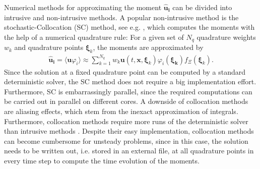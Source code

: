 Numerical methods for approximating the moment $\bm{\hat u_i}$ can be divided into intrusive and non-intrusive methods. A popular non-intrusive method is the stochastic-Collocation (SC) method, see e.g. \cite{xiu2005high,babuvska2007stochastic,loeven2008probabilistic}, which computes the moments with the help of a numerical quadrature rule: For a given set of $N_q$ quadrature weights $w_k$ and quadrature points $\bm{\xi}_k$, the moments are approximated by
\begin{align*}
\bm{\hat u_i} = \langle \bm{u}\varphi_i \rangle \approx \sum_{k = 1}^{N_q}w_k \bm{u}({t,\bm{x},\bm{\xi}_k})\varphi_i(\bm{\xi_k})f_{\Xi}(\bm{\xi}_k).
\end{align*} 
Since the solution at a fixed quadrature point can be computed by a standard deterministic solver, the SC method does not require a big implementation effort. Furthermore, SC is embarrassingly parallel, since the required computations can be carried out in parallel on different cores. A downside of collocation methods are aliasing effects, which stem from the inexact approximation of integrals. Furthermore, collocation methods require more runs of the deterministic solver than intrusive methods \cite{xiu2009fast,alekseev2011estimation}. Despite their easy implementation, collocation methods can become cumbersome for unsteady problems, since in this case, the solution needs to be written out, i.e. stored in an external file, at all quadrature points in every time step to compute the time evolution of the moments.

